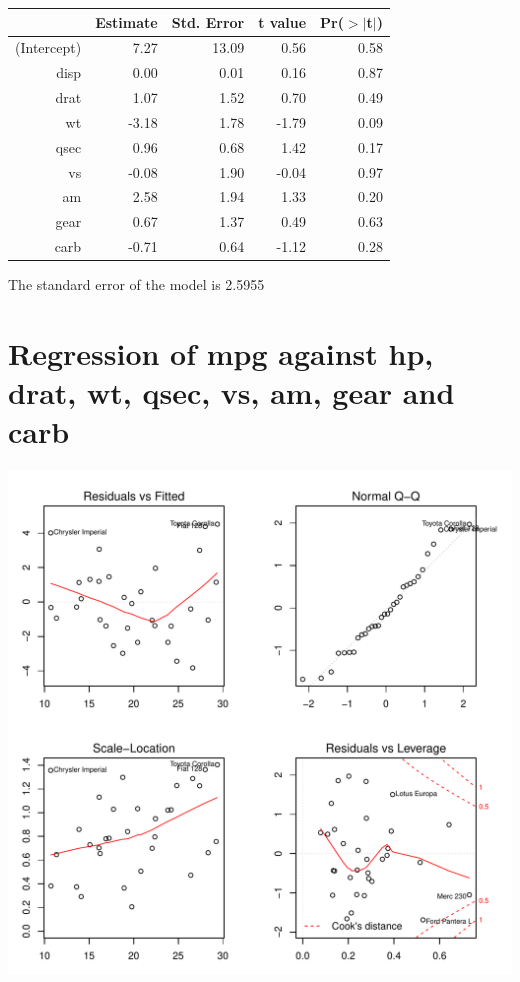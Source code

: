 \documentclass{article}\usepackage[]{graphicx}\usepackage[]{color}
\makeatletter
\def\maxwidth{ %
  \ifdim\Gin@nat@width>\linewidth
    \linewidth
  \else
    \Gin@nat@width
  \fi
}
\newenvironment{knitrout}{}{} %
\makeatother
\begin{document}
\begin{table}[ht]
\centering
\begin{tabular}{rrrrr}
  \hline
 & Estimate & Std. Error & t value & Pr($>$$|$t$|$) \\ 
  \hline
(Intercept) & 7.27 & 13.09 & 0.56 & 0.58 \\ 
  disp & 0.00 & 0.01 & 0.16 & 0.87 \\ 
  drat & 1.07 & 1.52 & 0.70 & 0.49 \\ 
  wt & -3.18 & 1.78 & -1.79 & 0.09 \\ 
  qsec & 0.96 & 0.68 & 1.42 & 0.17 \\ 
  vs & -0.08 & 1.90 & -0.04 & 0.97 \\ 
  am & 2.58 & 1.94 & 1.33 & 0.20 \\ 
  gear & 0.67 & 1.37 & 0.49 & 0.63 \\ 
  carb & -0.71 & 0.64 & -1.12 & 0.28 \\ 
   \hline
\end{tabular}
\end{table}




The standard error of the model is 2.5955

\newpage

\section{Regression of mpg against hp, drat, wt, qsec, vs, am, gear and carb }
\begin{knitrout}
\color{fgcolor}

{\centering \includegraphics[width=\maxwidth]{figure/lm-hp-drat-wt-qsec-vs-am-gear-carb} 

}



\end{knitrout}
\end{document}
